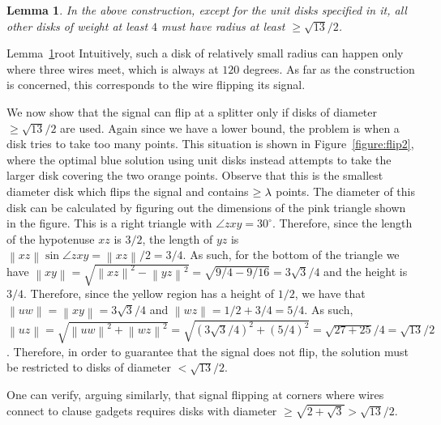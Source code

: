 \ifx\STACS\undefined \documentclass[12pt]{article}\else \documentclass[runningheads,a4paper]{llncs}
\newtheorem{lemma}[theorem]{Lemma}\newtheorem{definition}[theorem]{Definition}
\newcommand{\distE}[1]{\left\| {#1}  \right\|}
\newcommand{\lemlab}[1]{\label{lemma:#1}}
\newcommand{\lemref}[1]{Lemma~\ref{lemma:#1}}
\newcommand{\figlab}[1]{\label{figure:#1}}
\newcommand{\figref}[1]{Figure~\ref{figure:#1}}
\begin{document}
\begin{lemma}
\lemlab{root}
    In the above construction, except for the unit disks specified in
    it, all other disks of weight at least $4$ must have radius at
    least $\geq \sqrt{13}/2$.
\end{lemma}

\begin{proof:in:appendix:e}{\lemref{root}}{root}
    Intuitively, such a disk of relatively small radius can happen
    only where three wires meet, which is always at $120$ degrees. As
    far as the construction is concerned, this corresponds to the wire
    flipping its signal.

    \parpic[r]{\begin{minipage}{0.4\linewidth}{\texttt{[image: figs/flip2]}}\vspace*{-0.4cm}
           \captionof{figure}{}\figlab{flip2} \smallskip
       \end{minipage}}
    
We now show that the signal can flip at a splitter only if disks
    of diameter $\geq \sqrt{13}/2$ are used.  Again since we have a
    lower bound, the problem is when a disk tries to take too many
    points.  This situation is shown in \figref{flip2}, where the
    optimal blue solution using unit disks instead attempts to take
    the larger disk covering the two orange points.  Observe that this
    is the smallest diameter disk which flips the signal and contains
    $\geq \lambda$ points.  The diameter of this disk can be calculated by
    figuring out the dimensions of the pink triangle shown in the
    figure.  This is a right triangle with $\angle zxy = 30^\circ$.
    Therefore, since the length of the hypotenuse $xz$ is $3/2$, the
    length of $yz$ is $\distE{x z} \sin \angle zxy = \distE{xz}/2 =
    3/4$. As such, for the bottom of the triangle we have $\distE {x
       y} = \sqrt{\distE{xz}^2 - \distE{yz}^2} = \sqrt{9/4 - 9/16} =
    3\sqrt{3}/4$ and the height is $3/4$.  Therefore, since the yellow
    region has a height of $1/2$, we have that $\distE{uw} = \distE{xy
    } = 3\sqrt{3}/4$ and $\distE{wz} = 1/2 + 3/4 = 5/4$. As such,
    $\distE{uz} = \sqrt{ \distE{uw}^2 + \distE{wz}^2} =
    \sqrt{(3\sqrt{3}/4)^2+(5/4)^2} = \sqrt{27+25}/4 = \sqrt{13}/2$.
    Therefore, in order to guarantee that the signal does not flip,
    the solution must be restricted to disks of diameter
    $<\sqrt{13}/2$.

    One can verify, arguing similarly, that signal flipping at corners
    where wires connect to clause gadgets requires disks with diameter
    $\geq \sqrt{2+\sqrt{3}}>\sqrt{13}/2$. 
\end{proof:in:appendix:e}
\end{document}
